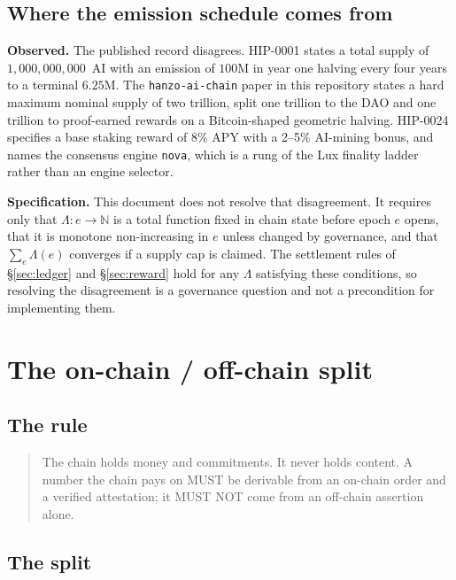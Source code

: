 \documentclass[11pt,a4paper]{article}
\theoremstyle{definition}
\theoremstyle{remark}
\newcommand{\code}[1]{\texttt{#1}}
\begin{document}
\subsection{Where the emission schedule comes from}
\label{sec:disagreement}

\textbf{Observed.} The published record disagrees. HIP-0001 states a total
supply of $1{,}000{,}000{,}000$~AI with an emission of $100$M in year one
halving every four years to a terminal $6.25$M. The \code{hanzo-ai-chain} paper
in this repository states a hard maximum nominal supply of two trillion, split
one trillion to the DAO and one trillion to proof-earned rewards on a
Bitcoin-shaped geometric halving. HIP-0024 specifies a base staking reward of
8\% APY with a 2--5\% AI-mining bonus, and names the consensus engine
\code{nova}, which is a rung of the Lux finality ladder rather than an engine
selector.

\textbf{Specification.} This document does not resolve that disagreement. It
requires only that $\Lambda: e \to \mathbb{N}$ is a total function fixed in
chain state before epoch $e$ opens, that it is monotone non-increasing in $e$
unless changed by governance, and that $\sum_e \Lambda(e)$ converges if a supply
cap is claimed. The settlement rules of \S\ref{sec:ledger} and
\S\ref{sec:reward} hold for any $\Lambda$ satisfying these conditions, so
resolving the disagreement is a governance question and not a precondition for
implementing them.

\section{The on-chain / off-chain split}
\label{sec:split}

\subsection{The rule}

\begin{quote}
The chain holds money and commitments. It never holds content. A number the
chain pays on MUST be derivable from an on-chain order and a verified
attestation; it MUST NOT come from an off-chain assertion alone.
\end{quote}

\subsection{The split}
\end{document}
